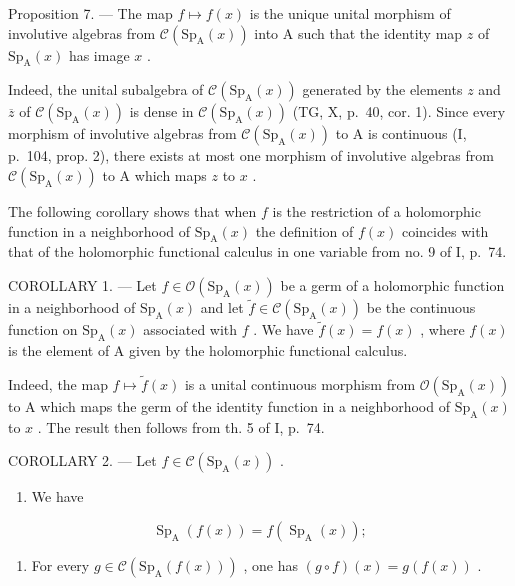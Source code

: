 Proposition 7. — The map \(f \mapsto f(x)\) is the unique unital morphism of involutive algebras from \(\mathcal{C}(\mathrm{Sp}_{\mathrm{A}}(x))\) into A such that the identity map \(z\) of \(\mathrm{Sp}_{\mathrm{A}}(x)\) has image \(x\) .

Indeed, the unital subalgebra of \(\mathcal{C}(\mathrm{Sp}_{\mathrm{A}}(x))\) generated by the elements \(z\) and \(\overline{z}\) of \(\mathcal{C}(\mathrm{Sp}_{\mathrm{A}}(x))\) is dense in \(\mathcal{C}(\mathrm{Sp}_{\mathrm{A}}(x))\) (TG, X, p.~40, cor. 1). Since every morphism of involutive algebras from \(\mathcal{C}(\mathrm{Sp}_{\mathrm{A}}(x))\) to A is continuous (I, p.~104, prop. 2), there exists at most one morphism of involutive algebras from \(\mathcal{C}(\mathrm{Sp}_{\mathrm{A}}(x))\) to A which maps \(z\) to \(x\) .

The following corollary shows that when \(f\) is the restriction of a holomorphic function in a neighborhood of \(\mathrm{Sp}_{\mathrm{A}}(x)\) the definition of \(f(x)\) coincides with that of the holomorphic functional calculus in one variable from no. 9 of I, p.~74.

COROLLARY 1. --- Let \(f \in \mathcal{O}(\mathrm{Sp}_{\mathrm{A}}(x))\) be a germ of a holomorphic function in a neighborhood of \(\mathrm{Sp}_{\mathrm{A}}(x)\) and let \(\widetilde{f} \in \mathcal{C}(\mathrm{Sp}_{\mathrm{A}}(x))\) be the continuous function on \(\mathrm{Sp}_{\mathrm{A}}(x)\) associated with \(f\) . We have \(\widetilde{f}(x) = f(x)\) , where \(f(x)\) is the element of A given by the holomorphic functional calculus.

Indeed, the map \(f \mapsto \widetilde{f}(x)\) is a unital continuous morphism from \(\mathcal{O}(\mathrm{Sp}_{\mathrm{A}}(x))\) to A which maps the germ of the identity function in a neighborhood of \(\mathrm{Sp}_{\mathrm{A}}(x)\) to \(x\) . The result then follows from th. 5 of I, p.~74.

COROLLARY 2. --- Let \(f \in \mathcal{C}(\mathrm{Sp}_{\mathrm{A}}(x))\) .

\begin{enumerate}
\def\labelenumi{\alph{enumi})}
\tightlist
\item
  We have
\end{enumerate}

\[
\operatorname{Sp} _ {\mathrm{A}} (f (x)) = f (\operatorname{Sp} _ {\mathrm{A}} (x));
\]

\begin{enumerate}
\def\labelenumi{\alph{enumi})}
\setcounter{enumi}{1}
\tightlist
\item
  For every \(g \in \mathcal{C}(\mathrm{Sp}_{\mathrm{A}}(f(x)))\) , one has \((g \circ f)(x) = g(f(x))\) .
\end{enumerate}


